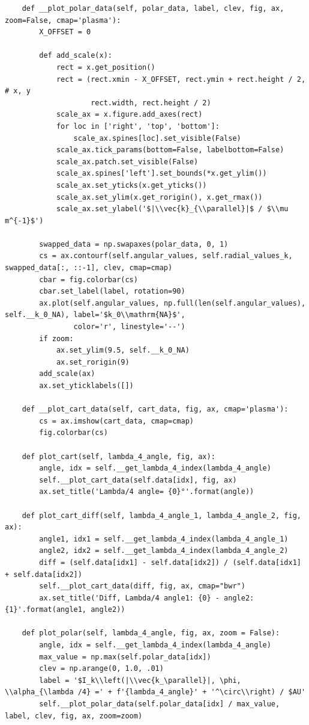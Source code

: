 \documentclass[a4paper, titlepage,  ngerman]{book}
\begin{document}
\begin{verbatim}
    def __plot_polar_data(self, polar_data, label, clev, fig, ax, zoom=False, cmap='plasma'):
        X_OFFSET = 0

        def add_scale(x):
            rect = x.get_position()
            rect = (rect.xmin - X_OFFSET, rect.ymin + rect.height / 2,  # x, y
                    rect.width, rect.height / 2)
            scale_ax = x.figure.add_axes(rect)
            for loc in ['right', 'top', 'bottom']:
                scale_ax.spines[loc].set_visible(False)
            scale_ax.tick_params(bottom=False, labelbottom=False)
            scale_ax.patch.set_visible(False)
            scale_ax.spines['left'].set_bounds(*x.get_ylim())
            scale_ax.set_yticks(x.get_yticks())
            scale_ax.set_ylim(x.get_rorigin(), x.get_rmax())
            scale_ax.set_ylabel('$|\\vec{k}_{\\parallel}|$ / $\\mu m^{-1}$')

        swapped_data = np.swapaxes(polar_data, 0, 1)
        cs = ax.contourf(self.angular_values, self.radial_values_k, swapped_data[:, ::-1], clev, cmap=cmap)
        cbar = fig.colorbar(cs)
        cbar.set_label(label, rotation=90)
        ax.plot(self.angular_values, np.full(len(self.angular_values), self.__k_0_NA), label='$k_0\\mathrm{NA}$',
                color='r', linestyle='--')
        if zoom:
            ax.set_ylim(9.5, self.__k_0_NA)
            ax.set_rorigin(9)
        add_scale(ax)
        ax.set_yticklabels([])

    def __plot_cart_data(self, cart_data, fig, ax, cmap='plasma'):
        cs = ax.imshow(cart_data, cmap=cmap)
        fig.colorbar(cs)

    def plot_cart(self, lambda_4_angle, fig, ax):
        angle, idx = self.__get_lambda_4_index(lambda_4_angle)
        self.__plot_cart_data(self.data[idx], fig, ax)
        ax.set_title('Lambda/4 angle= {0}°'.format(angle))

    def plot_cart_diff(self, lambda_4_angle_1, lambda_4_angle_2, fig, ax):
        angle1, idx1 = self.__get_lambda_4_index(lambda_4_angle_1)
        angle2, idx2 = self.__get_lambda_4_index(lambda_4_angle_2)
        diff = (self.data[idx1] - self.data[idx2]) / (self.data[idx1] + self.data[idx2])
        self.__plot_cart_data(diff, fig, ax, cmap="bwr")
        ax.set_title('Diff, Lambda/4 angle1: {0} - angle2: {1}'.format(angle1, angle2))

    def plot_polar(self, lambda_4_angle, fig, ax, zoom = False):
        angle, idx = self.__get_lambda_4_index(lambda_4_angle)
        max_value = np.max(self.polar_data[idx])
        clev = np.arange(0, 1.0, .01)
        label = '$I_k\\left(|\\vec{k_\parallel}|, \phi, \\alpha_{\lambda /4} =' + f'{lambda_4_angle}' + '^\circ\\right) / $AU'
        self.__plot_polar_data(self.polar_data[idx] / max_value, label, clev, fig, ax, zoom=zoom)


\end{verbatim}
\end{document}
